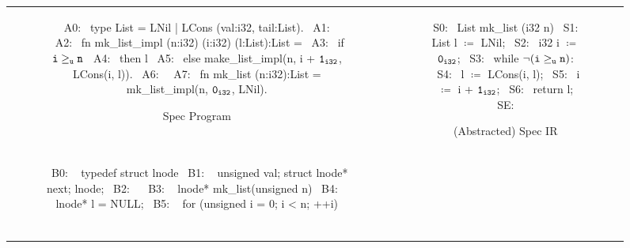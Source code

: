 \begin{figure}[t]
\begin{tabular}{cc}
\begin{subfigure}[b]{.59\textwidth}
\begin{center}
\begin{allLangEnvScript}
~{\tiny \textcolor{mygray}{A0:}}~ type List = LNil | LCons (val:i32, tail:List).
~{\tiny \textcolor{mygray}{A1:}}~
~{\tiny \textcolor{mygray}{A2:}}~ fn mk_list_impl (n:i32) (i:i32) (l:List):List =
~{\tiny \textcolor{mygray}{A3:}}~    if ${\tt i \geq_u n}$
~{\tiny \textcolor{mygray}{A4:}}~       then l
~{\tiny \textcolor{mygray}{A5:}}~       else make_list_impl(n, i + ${\tt 1_{i32}}$, LCons(i, l)).
~{\tiny \textcolor{mygray}{A6:}}~
~{\tiny \textcolor{mygray}{A7:}}~ fn mk_list (n:i32):List = mk_list_impl(n, ${\tt 0_{i32}}$, LNil).
\end{allLangEnvScript}
\end{center}
\caption{\label{fig:llAllocSpec}Spec Program}
\end{subfigure}%
&
\begin{subfigure}[b]{0.41\textwidth}
\begin{center}
\begin{allLangEnvScript}
~{\tiny \textcolor{mygray}{S0:}}~ List mk_list (i32 n) {
~{\tiny \textcolor{mygray}{S1:}}~   List l $\coloneq$ LNil;
~{\tiny \textcolor{mygray}{S2:}}~   i32  i $\coloneq$ ${\tt 0_{i32}}$;
~{\tiny \textcolor{mygray}{S3:}}~   while $\mathrm{\tt \neg (i \geq_{u} n)}$:
~{\tiny \textcolor{mygray}{S4:}}~     l $\coloneq$ LCons(i, l);
~{\tiny \textcolor{mygray}{S5:}}~     i $\coloneq$ i + ${\tt 1_{i32}}$;
~{\tiny \textcolor{mygray}{S6:}}~   return l;
~{\tiny \textcolor{mygray}{SE:}}~ }
\end{allLangEnvScript}
\end{center}
\caption{\label{fig:llAllocSpecIR}(Abstracted) Spec IR}
\end{subfigure}%
\\
\begin{subfigure}[b]{0.59\textwidth}
\begin{center}
\begin{allLangEnvScript}
~{\tiny \textcolor{mygray}{B0: }}~ typedef struct lnode {
~{\tiny \textcolor{mygray}{B1: }}~   unsigned val; struct lnode* next; } lnode;
~{\tiny \textcolor{mygray}{B2: }}~ 
~{\tiny \textcolor{mygray}{B3: }}~ lnode* mk_list(unsigned n) {
~{\tiny \textcolor{mygray}{B4: }}~   lnode* l = NULL;
~{\tiny \textcolor{mygray}{B5: }}~   for (unsigned i = 0; i < n; ++i) {                     $\phantom{m \coloneq \mathrm{\tt m[\&\structPointer{\tt p}{m}{\tt lnode}{val} \leftarrow i]_{i32}};}$
}}
\end{allLangEnvScript}
\end{center}
\end{subfigure}
\end{tabular}
\end{figure}
